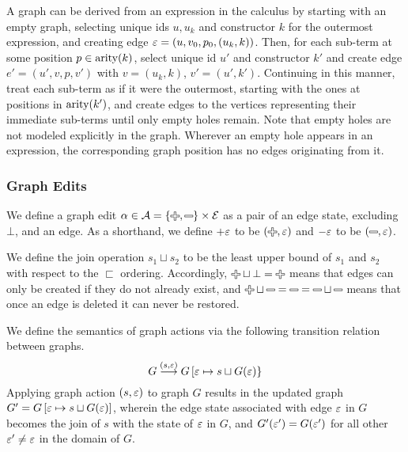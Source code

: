 
\vspace*{\baselineskip}

A graph can be derived from an expression in the calculus by starting with an
empty graph, selecting unique ids $u, u_k$ and constructor $k$ for the outermost
expression, and creating edge $\varepsilon = (u, v_0, p_0, (u_k, k))$. Then, for each
sub-term at some position $p \in \operatorname{\text{arity}}(k)$, select unique id $u'$ and
constructor $k'$ and create edge $e' = (u', v, p, v')$ with $v = (u_k, k)$, $v'
= (u', k')$. Continuing in this manner, treat each sub-term as if it were the
outermost, starting with the ones at positions in $\operatorname{\text{arity}}(k')$, and create edges
to the vertices representing their immediate sub-terms until only empty holes
remain. Note that empty holes are not modeled explicitly in the graph. Wherever
an empty hole appears in an expression, the corresponding graph position has no
edges originating from it.


\subsubsection{Graph Edits}%
\label{sub:Graph Edits}

We define a graph edit $\alpha \in \A = \left\{\Plus, \Minus\right\} \times \E$
as a pair of an edge state, excluding $\bot$, and an edge. As a shorthand, we
define $+\varepsilon$ to be $(\Plus, \e)$ and $-\varepsilon$ to be $(\Minus, \e)$.

We define the join operation $s_1 \sqcup s_2$ to be the least upper bound of
$s_1$ and $s_2$ with respect to the $\sqsubset$ ordering. Accordingly, $\Plus
\sqcup \bot = \Plus$ means that edges can only be created if they do not already
exist, and $\Plus \sqcup \Minus = \Minus = \Minus \sqcup \Minus$ means that once
an edge is deleted it can never be restored.

We define the semantics of graph actions via the following transition relation
between graphs.
\[
  G \overset{(s,\varepsilon)}{\longrightarrow} G\left[ \varepsilon \mapsto s \sqcup G(\varepsilon) \right\}
\]
Applying graph action $\left(s, \varepsilon\right)$ to graph $G$ results in the
updated graph $G' = G\left[\varepsilon \mapsto s \sqcup G(\varepsilon) \right]$, wherein the edge
state associated with edge $\varepsilon$ in $G$ becomes the join of $s$ with the state of
$\varepsilon$ in $G$, and $G'(\varepsilon') = G(\varepsilon')$ for all other $\varepsilon' \ne \varepsilon$ in the domain of
$G$.

